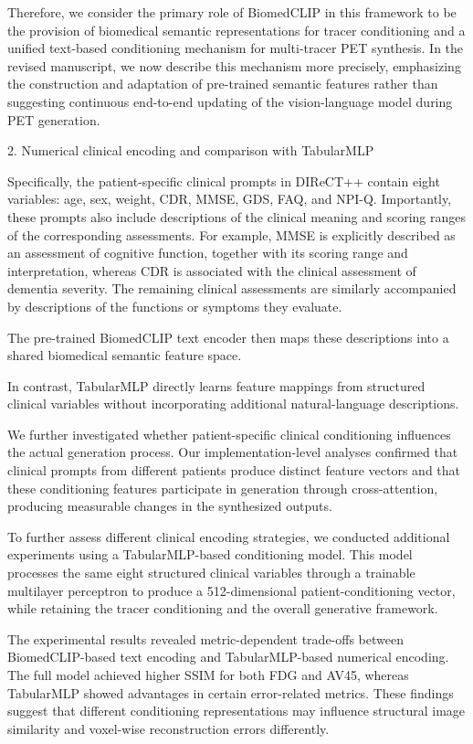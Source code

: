 {Therefore, we consider the primary role of BiomedCLIP in this framework to be the provision of biomedical semantic representations for tracer conditioning and a unified text-based conditioning mechanism for multi-tracer PET synthesis. In the revised manuscript, we now describe this mechanism more precisely, emphasizing the construction and adaptation of pre-trained semantic features rather than suggesting continuous end-to-end updating of the vision-language model during PET generation.

2. Numerical clinical encoding and comparison with TabularMLP

Specifically, the patient-specific clinical prompts in DIReCT++ contain eight variables: age, sex, weight, CDR, MMSE, GDS, FAQ, and NPI-Q. Importantly, these prompts also include descriptions of the clinical meaning and scoring ranges of the corresponding assessments. For example, MMSE is explicitly described as an assessment of cognitive function, together with its scoring range and interpretation, whereas CDR is associated with the clinical assessment of dementia severity. The remaining clinical assessments are similarly accompanied by descriptions of the functions or symptoms they evaluate.

The pre-trained BiomedCLIP text encoder then maps these descriptions into a shared biomedical semantic feature space.

In contrast, TabularMLP directly learns feature mappings from structured clinical variables without incorporating additional natural-language descriptions.

We further investigated whether patient-specific clinical conditioning influences the actual generation process. Our implementation-level analyses confirmed that clinical prompts from different patients produce distinct feature vectors and that these conditioning features participate in generation through cross-attention, producing measurable changes in the synthesized outputs.

To further assess different clinical encoding strategies, we conducted additional experiments using a TabularMLP-based conditioning model. This model processes the same eight structured clinical variables through a trainable multilayer perceptron to produce a 512-dimensional patient-conditioning vector, while retaining the tracer conditioning and the overall generative framework.

The experimental results revealed metric-dependent trade-offs between BiomedCLIP-based text encoding and TabularMLP-based numerical encoding. The full model achieved higher SSIM for both FDG and AV45, whereas TabularMLP showed advantages in certain error-related metrics. These findings suggest that different conditioning representations may influence structural image similarity and voxel-wise reconstruction errors differently.

}
